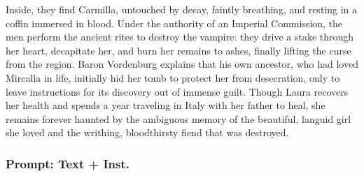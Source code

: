 \documentclass{article} %
\begin{document}
Inside, they find Carmilla, untouched by decay, faintly breathing, and resting in a coffin immersed in blood. Under the authority of an Imperial Commission, the men perform the ancient rites to destroy the vampire: they drive a stake through her heart, decapitate her, and burn her remains to ashes, finally lifting the curse from the region. Baron Vordenburg explains that his own ancestor, who had loved Mircalla in life, initially hid her tomb to protect her from desecration, only to leave instructions for its discovery out of immense guilt. Though Laura recovers her health and spends a year traveling in Italy with her father to heal, she remains forever haunted by the ambiguous memory of the beautiful, languid girl she loved and the writhing, bloodthirsty fiend that was destroyed.

\subsubsection{Prompt: Text + Inst.}
\end{document}
